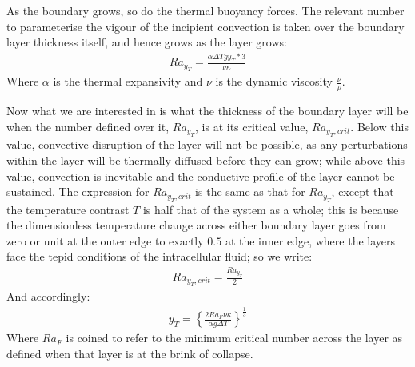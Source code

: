 \documentclass[letterpaper,10pt,english]{jupyterBook}
\begin{document}
\sphinxAtStartPar
As the boundary grows, so do the thermal buoyancy forces. The relevant  number to parameterise the vigour of the incipient convection is taken over the boundary layer thickness itself, and hence grows as the layer grows:
\begin{equation*}
\begin{split} Ra_{y_T} = \frac{\alpha \Delta T g y_T*3}{\nu \kappa} \end{split}
\end{equation*}
\sphinxAtStartPar
Where \(\alpha\) is the thermal expansivity and \(\nu\) is the dynamic viscosity \(\frac{\nu}{\rho}\).

\sphinxAtStartPar
Now what we are interested in is what the thickness of the boundary layer will be when the  number defined over it, \(Ra_{y_T}\), is at its critical value, \(Ra_{y_T,crit}\). Below this value, convective disruption of the layer will not be possible, as any perturbations within the layer will be thermally diffused before they can grow; while above this value, convection is inevitable and the conductive profile of the layer cannot be sustained. The expression for \(Ra_{y_T,crit}\) is the same as that for \(Ra_{y_T}\), except that the temperature contrast \(T\) is half that of the system as a whole; this is because the dimensionless temperature change across either boundary layer goes from zero or unit at the outer edge to exactly \(0.5\) at the inner edge, where the layers face the tepid conditions of the intracellular fluid; so we write:
\begin{equation*}
\begin{split} Ra_{y_T,crit} = \frac{Ra_{y_T}}{2} \end{split}
\end{equation*}
\sphinxAtStartPar
And accordingly:
\begin{equation*}
\begin{split} y_T = \left\{ \frac{2 Ra_F \nu \kappa}{\alpha g \Delta T} \right\} ^{\frac{1}{3}} \end{split}
\end{equation*}
\sphinxAtStartPar
Where \(Ra_F\) is coined to refer to the minimum critical  number across the layer as defined when that layer is at the brink of collapse.
\end{document}
